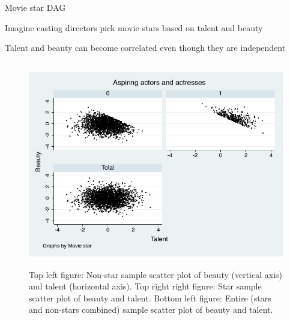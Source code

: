 \documentclass{beamer}
\begin{document}
\begin{frame}{Movie star DAG}

Imagine casting directors pick movie stars based on talent and beauty

  \begin{center}
  \end{center}

Talent and beauty can become correlated even though they are independent


\end{frame}

\begin{frame}[shrink=20,plain]

  \begin{figure}
    \includegraphics[height=9cm]{./lecture_includes/beauty_collider.pdf}
    \caption{Top left figure: Non-star sample scatter plot of beauty (vertical axis) and talent (horizontal axis). Top right right figure: Star sample scatter plot of beauty and talent.  Bottom left figure: Entire (stars and non-stars combined) sample scatter plot of beauty and talent.}
  \end{figure}
\end{frame}
\end{document}
